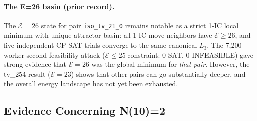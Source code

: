 \documentclass[11pt,a4paper]{article}
\theoremstyle{remark}
\newcommand{\E}{\mathcal{E}}
\begin{document}
\paragraph{The E=26 basin (prior record).}
The $\E=26$ state for pair \texttt{iso\_tv\_21\_0} remains notable as a strict 1-IC local
minimum with unique-attractor basin: all 1-IC-move neighbors have $\E \geq 26$, and five
independent CP-SAT trials converge to the same canonical $L_3$. The 7,200 worker-second
feasibility attack ($\E \leq 25$ constraint: 0 SAT, 0 INFEASIBLE) gave strong evidence
that $\E=26$ was the global minimum for \emph{that pair}. However, the tv\_254 result
($\E=23$) shows that other pairs can go substantially deeper, and the overall energy
landscape has not yet been exhausted.

\subsection{Evidence Concerning N(10)=2}
\end{document}
